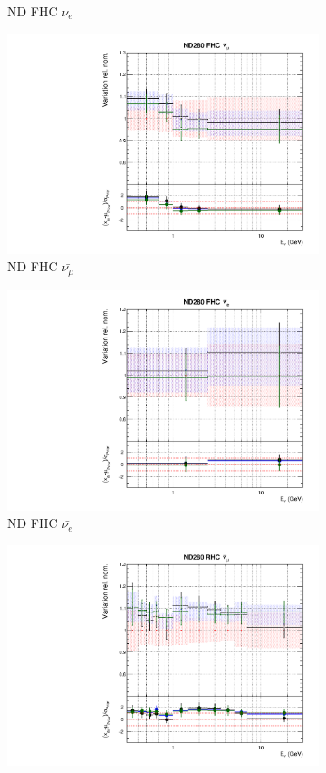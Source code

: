\begin{figure}
\begin{subfigure}{0.24\textwidth}
  \caption{ND FHC $\nu_e$}
\end{subfigure}
\begin{subfigure}{0.24\textwidth}
  \centering
  \includegraphics[width=0.95\linewidth]{figs/newolddatafitsflux_2}
  \caption{ND FHC $\bar{\nu_{\mu}}$}
\end{subfigure}
\begin{subfigure}{0.24\textwidth}
  \centering
  \includegraphics[width=0.95\linewidth]{figs/newolddatafitsflux_3}
  \caption{ND FHC $\bar{\nu_{e}}$}
\end{subfigure}
\begin{subfigure}{0.24\textwidth}
  \centering
  \includegraphics[width=0.95\linewidth]{figs/newolddatafitsflux_4}

\end{subfigure}
\end{figure}
